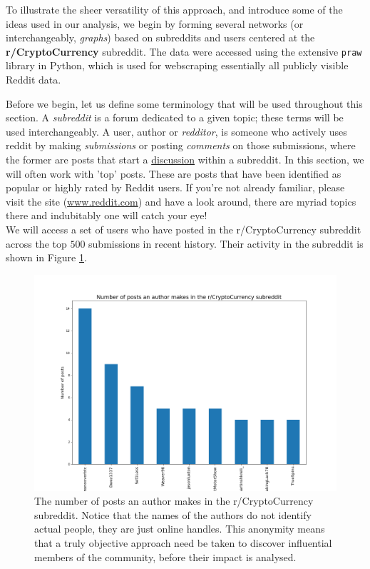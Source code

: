 \documentclass[twoside]{report}
\newcommand{\code}{\texttt}
\begin{document}
\begin{spacing}{1}
To illustrate the sheer versatility of this approach, and introduce some of the ideas used in our analysis, we begin by forming several networks (or interchangeably, \textit{graphs}) based on subreddits and users centered at the \textbf{r/CryptoCurrency} subreddit. The data were accessed using the extensive \code{praw} library in Python, which is used for webscraping essentially all publicly visible Reddit data. 

Before we begin, let us define some terminology that will be used throughout this section. A \textit{subreddit} is a forum dedicated to a given topic; these terms will be used interchangeably. A user, author or \textit{redditor}, is someone who actively uses reddit by making \textit{submissions} or posting \textit{comments} on those submissions, where the former are posts that start a \underline{discussion} within a subreddit. In this section, we will often work with 'top' posts. These are posts that have been identified as popular or highly rated by Reddit users. If you're not already familiar, please visit the site (\url{www.reddit.com}) and have a look around, there are myriad topics there and indubitably one will catch your eye!\\ 

We will access a set of users who have posted in the r/CryptoCurrency subreddit across the top $500$ submissions in recent history. Their activity in the subreddit is shown in Figure \ref{fig:num_posts_r_crypto}. 

\begin{figure}
    \centering
    \includegraphics[width=0.8\linewidth]{Reddit_Analysis/Network_Analysis/num_posts_r_crypto.png}
    \caption{The number of posts an author makes in the r/CryptoCurrency subreddit. Notice that the names of the authors do not identify actual people, they are just online handles. This anonymity means that a truly objective approach need be taken to discover influential members of the community, before their impact is analysed.}
    \label{fig:num_posts_r_crypto}
\end{figure}


\end{spacing}
\end{document}
